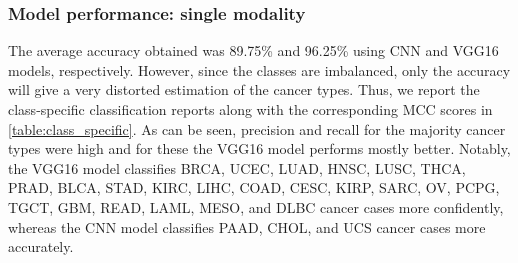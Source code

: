 \subsubsection{Model performance: single modality}
The average accuracy obtained was 89.75\% and 96.25\% using CNN and VGG16 models, respectively. However, since the classes are imbalanced, only the accuracy will give a very distorted estimation of the cancer types. Thus, we report the class-specific classification reports along with the corresponding MCC scores in \cref{table:class_specific}. As can be seen, precision and recall for the majority cancer types were high and for these the VGG16 model performs mostly better. Notably, the VGG16 model classifies BRCA, UCEC, LUAD, HNSC, LUSC, THCA, PRAD, BLCA, STAD, KIRC, LIHC, COAD, CESC, KIRP, SARC, OV, PCPG, TGCT, GBM, READ, LAML, MESO, and DLBC cancer cases more confidently, whereas the CNN model classifies PAAD, CHOL, and UCS cancer cases more accurately. 

